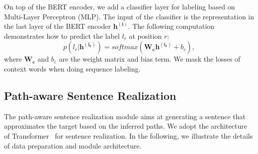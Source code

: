 \documentclass[letterpaper]{article} %
\begin{document}
On top of the BERT encoder, we add a classifier layer for labeling based on Multi-Layer Perceptron (MLP). The input of the classifier is the  representation in the last layer of the BERT encoder $\bm{h^{(i)}}$. The following computation demonstrates how to predict the label $l_r$ at position $r$:
\begin{equation}
p(l_r|\bm{h^{(i_r)}}) = softmax(\bm{W_c}\bm{h^{(i_r)}}+b_c),
\end{equation}
where $\bm{W_c}$ and $b_c$ are the weight matrix and bias term. We mask  the losses of  context words when doing sequence labeling.



\subsection{Path-aware Sentence Realization}
The path-aware sentence realization module aims at generating a sentence that approximates the target based on the inferred paths. 
We adopt the architecture of Transformer~\cite{vaswani-et-al:transformer} for sentence realization.
In the following, we illustrate the details of data preparation and module architecture. 
\end{document}
